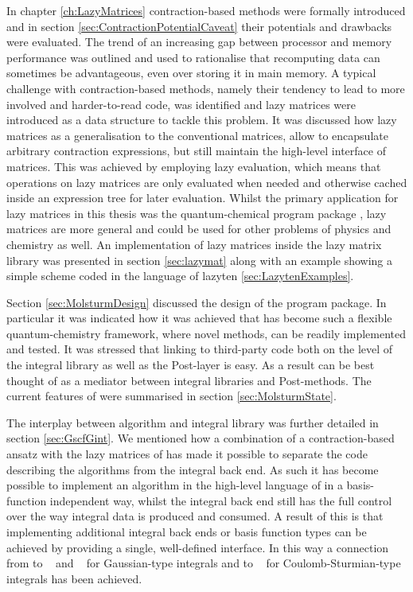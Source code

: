 In chapter \ref{ch:LazyMatrices} contraction-based methods
were formally introduced and in section \ref{sec:ContractionPotentialCaveat}
their potentials and drawbacks were evaluated.
The trend of an increasing gap between processor and memory performance
was outlined and used to rationalise that recomputing data
can sometimes be advantageous, even over storing it in main memory.
A typical challenge with contraction-based methods,
namely their tendency to lead to more involved and harder-to-read code,
was identified
and lazy matrices were introduced as a data structure
to tackle this problem.
It was discussed how lazy matrices as a generalisation
to the conventional matrices,
allow to encapsulate arbitrary contraction expressions,
but still maintain the high-level interface of matrices.
This was achieved by employing lazy evaluation,
which means that operations on lazy matrices are only
evaluated when needed
and otherwise cached inside an expression tree for later evaluation.
Whilst the primary application for lazy matrices in this thesis was the quantum-chemical
program package \molsturm,
lazy matrices are more general and could be used for other problems
of physics and chemistry as well.
An implementation of lazy matrices inside the
lazy matrix library \lazyten was presented in section \ref{sec:lazymat}
along with an example showing a simple \SCF
scheme coded in the language of lazyten \ref{sec:LazytenExamples}.


Section \ref{sec:MolsturmDesign} discussed
the design of the \molsturm program package.
In particular it was indicated how it was achieved
that \molsturm has become such a flexible quantum-chemistry framework,
where novel methods,
can be readily implemented and tested.
It was stressed that linking to third-party code
both on the level of the integral library as well
as the Post-\HF layer is easy.
As a result \molsturm can be best thought of as a mediator
between integral libraries and Post-\HF methods.
The current features of \molsturm
were summarised in section \ref{sec:MolsturmState}.

The interplay between \SCF algorithm and integral library
was further detailed in section \ref{sec:GscfGint}.
We mentioned how a combination of a contraction-based \SCF ansatz
with the lazy matrices of \lazyten
has made it possible to separate the code describing
the \SCF algorithms from the integral back end.
As such it has become possible to implement
an \SCF algorithm in the high-level language of \lazyten
in a basis-function independent way,
whilst the integral back end still has the full
control over the way integral data is produced and consumed.
A result of this is that implementing
additional integral back ends or basis function types
can be achieved by providing a single,
well-defined interface.
In this way a connection from \molsturm
to \libint~\cite{Libint2_231,Libint2} and \libcint~\cite{Sun2015}
for Gaussian-type integrals
and to \sturmint~\cite{sturmintWeb}
for Coulomb-Sturmian-type integrals has been achieved.

